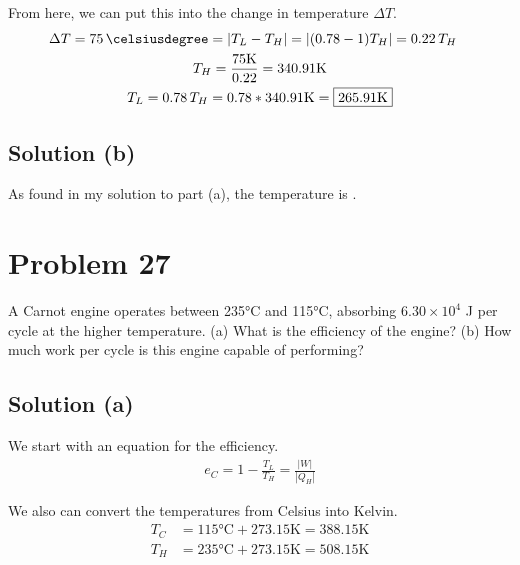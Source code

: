 \documentclass[12pt]{article}
\newcommand{\E}[1]{\times 10^{#1}}
\begin{document}
            From here, we can put this into the change in temperature $\Delta T$.
            \begin{gather}
                \begin{align}
                    \Delta T    &=  75\,\unit{\celsiusdegree}
                        =   \left| T_L - T_H \right|
                        =   \left| (0.78 - 1)T_H \right|
                        =   0.22\,T_H
                \end{align}\\
                T_H =   \frac{75\unit{\kelvin}}{0.22}
                    =   340.91\unit{\kelvin}\\
                T_L =   0.78\,T_H
                    =   0.78 * 340.91\unit{\kelvin}
                    =   \boxed{265.91\unit{\kelvin}}
            \end{gather}

        \subsection{Solution (b)}
            As found in my solution to part (a), the temperature is \boxed{265.91\unit{\kelvin}}.

    \pagebreak
    \section{Problem 27}
        A Carnot engine operates between 235\unit{\celsius} and 115\unit{\celsius}, absorbing $6.30\E{4}$ J per cycle at the higher temperature.
        (a) What is the efficiency of the engine? 
        (b) How much work per cycle is this engine capable of performing?

        \subsection{Solution (a)}
            We start with an equation for the efficiency.
            \begin{gather}
                e_C =   1 - \frac{T_L}{T_H}
                    =   \frac{\left| W \right|}{\left| Q_H \right|}
            \end{gather}

            We also can convert the temperatures from Celsius into Kelvin.
            \begin{align}
                T_C &=  115\unit{\celsius} + 273.15\unit{\kelvin}
                    =   388.15\unit{\kelvin}\\
                T_H &=  235\unit{\celsius} + 273.15\unit{\kelvin}
                    =   508.15\unit{\kelvin}
            \end{align}
\end{document}
